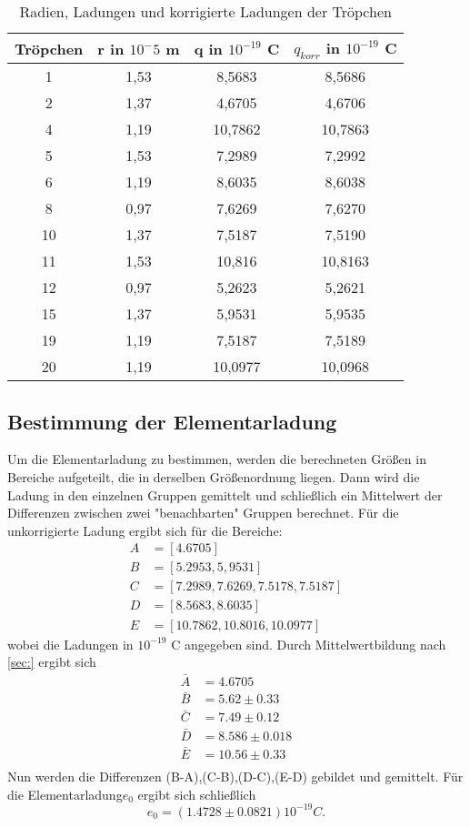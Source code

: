 \begin{table}[!ht]
    \centering
    \begin{tabular}{c c c c}
    \hline
        Tröpchen & r in $10^-5$ m  & q in $10^{-19}$ C & $q_{korr}$ in $10^{-19}$ C \\ 
    \hline
        1 & 1,53 & 8,5683 & 8,5686 \\ 
        2 & 1,37 & 4,6705 & 4,6706 \\ 
        4 & 1,19 & 10,7862 & 10,7863 \\ 
        5 & 1,53 & 7,2989 & 7,2992 \\ 
        6 & 1,19 & 8,6035 & 8,6038 \\ 
        8 & 0,97 & 7,6269 & 7,6270 \\ 
        10 & 1,37 & 7,5187 & 7,5190 \\ 
        11 & 1,53 & 10,816 & 10,8163 \\ 
        12 & 0,97 & 5,2623 & 5,2621 \\ 
        15 & 1,37 & 5,9531 & 5,9535 \\ 
        19 & 1,19 & 7,5187 & 7,5189 \\ 
        20 & 1,19 & 10,0977 & 10,0968 \\ 
    \end{tabular}
    \caption{Radien, Ladungen und korrigierte Ladungen der Tröpchen}
    \label{tab:rq}
\end{table}


\subsection{Bestimmung der Elementarladung}
Um die Elementarladung zu bestimmen, werden die berechneten Größen in Bereiche aufgeteilt, die in derselben Größenordnung liegen.
Dann wird die Ladung in den einzelnen Gruppen gemittelt und schließlich ein Mittelwert der Differenzen zwischen zwei "benachbarten" 
Gruppen berechnet.
Für die unkorrigierte Ladung ergibt sich für die Bereiche:
\begin{align*}
    A&=[4.6705] \\
    B&=[5.2953, 5,9531] \\
    C&=[7.2989,7.6269,7.5178,7.5187] \\
    D&=[8.5683,8.6035] \\
    E&=[10.7862,10.8016,10.0977]
\end{align*}
wobei die Ladungen in $10^{-19}$ C angegeben sind.
Durch Mittelwertbildung nach \ref{sec:} ergibt sich
\begin{align*}
    \bar{A}&= 4.6705\\
    \bar{B}&= 5.62\pm 0.33 \\
    \bar{C}&= 7.49 \pm 0.12 \\
    \bar{D}&= 8.586 \pm 0.018 \\
    \bar{E}&= 10.56 \pm 0.33 \\
\end{align*}
Nun werden die Differenzen (B-A),(C-B),(D-C),(E-D) gebildet und gemittelt.
Für die Elementarladung$e_0$ ergibt sich schließlich
\begin{equation*}
    e_0= (1.4728 \pm 0.0821) 10^{-19} C .
\end{equation*}

